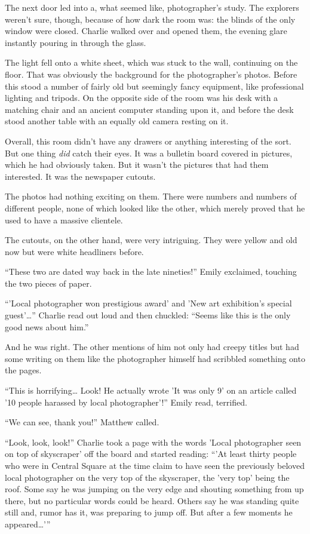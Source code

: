 The next door led into a, what seemed like, photographer's study. The explorers weren't sure, though, because of how dark the room was: the blinds of the only window were closed. Charlie walked over and opened them, the evening glare instantly pouring in through the glass.

The light fell onto a white sheet, which was stuck to the wall, continuing on the floor. That was obviously the background for the photographer's photos. Before this stood a number of fairly old but seemingly fancy equipment, like professional lighting and tripods. On the opposite side of the room was his desk with a matching chair and an ancient computer standing upon it, and before the desk stood another table with an equally old camera resting on it.

Overall, this room didn't have any drawers or anything interesting of the sort. But one thing \textit{did} catch their eyes. It was a bulletin board covered in pictures, which he had obviously taken. But it wasn't the pictures that had them interested. It was the newspaper cutouts.

The photos had nothing exciting on them. There were numbers and numbers of different people, none of which looked like the other, which merely proved that he used to have a massive clientele.

The cutouts, on the other hand, were very intriguing. They were yellow and old now but were white headliners before.

“These two are dated way back in the late nineties!” Emily exclaimed, touching the two pieces of paper.

“'Local photographer won prestigious award' and 'New art exhibition's special guest'…” Charlie read out loud and then chuckled: “Seems like this is the only good news about him.”

And he was right. The other mentions of him not only had creepy titles but had some writing on them like the photographer himself had scribbled something onto the pages.

“This is horrifying… Look! He actually wrote 'It was only 9' on an article called '10 people harassed by local photographer'!” Emily read, terrified.

“We can see, thank you!” Matthew called.

“Look, look, look!” Charlie took a page with the words 'Local photographer seen on top of skyscraper' off the board and started reading: “'At least thirty people who were in Central Square at the time claim to have seen the previously beloved local photographer on the very top of the skyscraper, the 'very top' being the roof. Some say he was jumping on the very edge and shouting something from up there, but no particular words could be heard. Others say he was standing quite still and, rumor has it, was preparing to jump off. But after a few moments he appeared…'”

